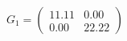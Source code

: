 \documentclass[preview]{standalone}
\begin{document}
\begin{align*}
G_1 = \begin{pmatrix} 11.11 & 0.00 \\ 0.00 & 22.22 \end{pmatrix}
\end{align*}
\end{document}
